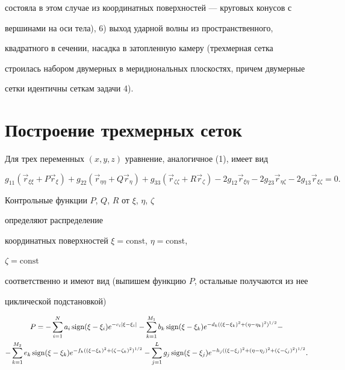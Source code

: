состояла в этом случае из координатных поверхностей --- круговых конусов с 


вершинами на оси тела), 6) выход ударной волны из пространственного, 


квадратного в сечении, насадка в затопленную камеру (трехмерная сетка 


строилась набором двумерных в меридиональных плоскостях, причем двумерные 


сетки идентичны сеткам задачи 4). 


 


\section{Построение трехмерных сеток} 


 


Для трех переменных $(x,y,z)$ уравнение, аналогичное (1), имеет вид 


\begin{equation} 


g_{11}(\Vec r_{\xi\xi}+P\Vec r_\xi)+g_{22}(\Vec r_{\eta\eta} 


+Q\Vec r_\eta)+g_{33}(\Vec r_{\zeta\zeta}+R\Vec r_\zeta) 


-2g_{12}\Vec r_{\xi\eta}-2g_{23}\Vec r_{\eta\zeta} 


-2g_{13}\Vec r_{\xi\zeta}=0. 


\end{equation} 


Контрольные функции $P$, $Q$, $R$ от $\xi$, $\eta$, $\zeta$ 


определяют распределение 


координатных поверхностей $\xi=\text{const}$, $\eta=\text{const}$, 


$\zeta=\text{const}$


соответственно и имеют вид (выпишем функцию $P$, остальные получаются из нее 


циклической подстановкой) 


\begin{multline*} 


P=-\sum^N_{i=1}a_i\sign(\xi-\xi_i)e^{-c_i|\xi-\xi_i|} 


-\sum^{M_1}_{k=1}b_k\sign(\xi-\xi_k) 


e^{-d_k((\xi-\xi_k)^2+(\eta-\eta_k)^2)^{1/2}}-\\ 


-\sum^{M_2}_{k=1}e_k\sign(\xi-\xi_k)


e^{-f_k((\xi-\xi_k)^2+(\zeta-\zeta_k)^2)^{1/2}} 


-\sum^L_{j=1}g_j\sign(\xi-\xi_j)


e^{-h_j((\xi-\xi_j)^2+(\eta-\eta_j)^2+(\zeta-\zeta_j)^2)^{1/2}}.


\end{multline*} 


